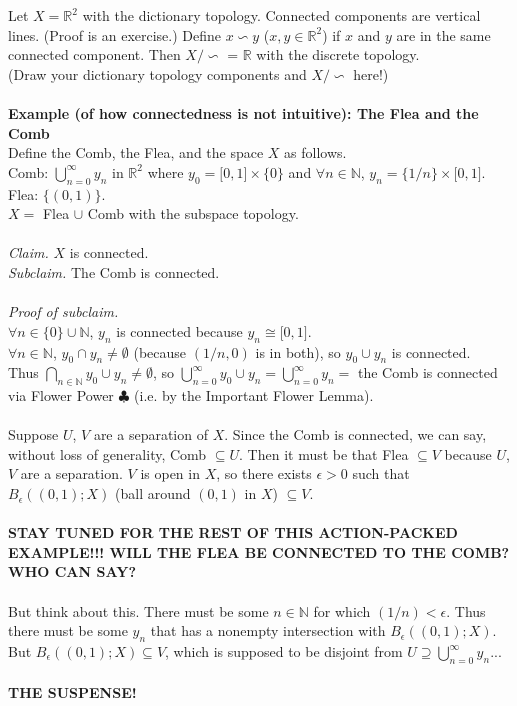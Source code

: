 \documentclass[10pt,reqno]{amsart}
\newtheorem*{Important Flower Lemma}{Important Flower Lemma}
\newtheorem*{Teeny Facts About Connected Components}{Teeny Facts About Connected Components}
\begin{document}
\vspace{.1in}
 Let $X = \mathbb{R}^2$ with the dictionary topology. Connected components are vertical lines. (Proof is an exercise.) Define $x\backsim y$ ($x, y \in \mathbb{R}^2$) if $x$ and $y$ are in the same connected component. Then $X/\backsim$ = $\mathbb{R}$ with the discrete topology. \\
(Draw your dictionary topology components and $X/\backsim$ here!)\\
\vspace{1.5in}\\
{\bf Example (of how connectedness is not intuitive): The Flea and the Comb}\\
Define the Comb, the Flea, and the space $X$ as follows.\\
Comb: ${\displaystyle\bigcup_{n=0}^{\infty}y_n}$ in $\mathbb{R}^2$ where $y_0 = \lbrack0,1\rbrack\times\{0\}$ and $\forall n\in \mathbb{N}$, $y_n = \{1/n\} \times \lbrack0,1\rbrack$.\\
Flea: $\{(0,1)\}$.\\
$X =$ Flea $\cup$ Comb with the subspace topology.\\\\
{\it Claim.} $X$ is connected.\\
{\it Subclaim.} The Comb is connected.\\\\
{\it Proof of subclaim.}\\
$\forall n \in \{0\} \cup \mathbb{N}$, $y_n$ is connected because $y_n \cong \lbrack0,1\rbrack$.\\
$\forall n \in \mathbb{N}$, $y_0 \cap y_n \neq \emptyset$  (because $(1/n, 0)$ is in both), so $y_0 \cup y_n$ is connected. \\
Thus ${\displaystyle\bigcap_{n\in \mathbb{N}}y_0 \cup y_n} \neq \emptyset$,  so ${\displaystyle\bigcup_{n=0}^{\infty}y_0 \cup y_n} = {\displaystyle\bigcup_{n=0}^{\infty}y_n} =$ the Comb is connected via Flower Power $\clubsuit$ (i.e. by the Important Flower Lemma).\\\\
Suppose $U$, $V$ are a separation of $X$. Since the Comb is connected, we can say, without loss of generality, Comb $\subseteq U$.  Then it must be that Flea $\subseteq V$ because $U$, $V$ are a separation. $V$ is open in $X$, so there exists $\epsilon > 0$ such that $B_{\epsilon}((0,1); X)$ (ball around $(0,1)$ in $X$) $\subseteq V$. \\\\
{\bf STAY TUNED FOR THE REST OF THIS ACTION-PACKED EXAMPLE!!! WILL THE FLEA BE CONNECTED TO THE COMB? WHO CAN SAY?}\\\\
But think about this. There must be some $n\in \mathbb{N}$ for which $(1/n) < \epsilon$. Thus there must be some $y_n$ that has a nonempty intersection with $B_{\epsilon}((0,1); X)$. But $B_{\epsilon}((0,1); X) \subseteq V$, which is supposed to be disjoint from $U \supseteq {\displaystyle\bigcup_{n=0}^{\infty}y_n}$...\\\\
{\bf THE SUSPENSE!}
\end{document}
